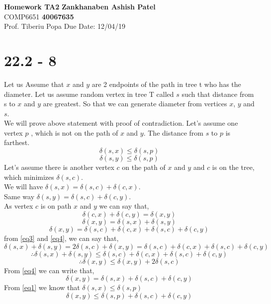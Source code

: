 \documentclass[a4paper, 11pt]{article}
\begin{document}
\noindent
\large\textbf{Homework TA2} \hfill \textbf{Zankhanaben Ashish Patel} \\
\normalsize COMP6651 \hfill \textbf{40067635} \\
Prof. Tiberiu Popa \hfill Due Date: 12/04/19 


\section{22.2 - 8}
Let us Assume that $x$ and $y$ are 2 endpoints of the path in tree t who has the diameter. Let us assume random vertex in tree T called $s$ such that distance from s to $x$ and $y$ are greatest. So that we can generate diameter from vertices $x$, $y$ and $s$. \\
We will prove above statement with proof of contradiction. Let's assume one vertex $p$ , which is not on the path of $x$ and $y$. The distance from $s$ to $p$ is  farthest.
\begin{equation}
\label{eq1}
\delta(s,x) \le \delta(s,p)
\end{equation}
\begin{equation}
\label{eq2}
\delta(s,y) \le \delta(s,p)
\end{equation}
Let's assume there is another vertex $c$ on the path of $x$ and $y$ and $c$ is on the tree, which minimizes $\delta(s,c)$.\\
We will have  $\delta(s,x) = \delta(s,c) + \delta(c,x).$\\
Same way $ \delta(s,y) = \delta(s,c) + \delta(c,y).$\\
As vertex $c$ is on path $x$ and $y$ we can say that,
\begin{equation}
\label{eq3}
\delta(c,x) + \delta(c,y) = \delta(x,y)
\end{equation}
$$\delta(x,y) = \delta(s,x) + \delta(s,y)$$
\begin{equation}
\label{eq4}
\delta(x,y) = \delta(s,c) + \delta(c,x) + \delta(s,c) + \delta(c,y)
\end{equation}
from \ref{eq3} and \ref{eq4}, we can say that,
\begin{equation}
\delta(s,x) + \delta(s,y) = 2 \delta(s,c) + \delta(x,y) 
                          = \delta(s,c) + \delta(c,x) + \delta(s,c) + \delta(c,y)
\end{equation}
$$\therefore \delta(s,x) + \delta(s,y) \leq \delta(s,c) + \delta(c,x) + \delta(s,c) + \delta(c,y)$$
$$\therefore \delta(x,y) \leq \delta(x,y) + 2 \delta(s,c)$$
From \ref{eq4} we can write that,
$$\delta(x,y) = \delta(s,x) + \delta(s,c) + \delta(c,y)$$
From \ref{eq1} we know that $\delta(s,x) \le \delta(s,p)$
$$\delta(x,y) \leq \delta(s,p) + \delta(s,c) + \delta(c,y)$$
\end{document}
